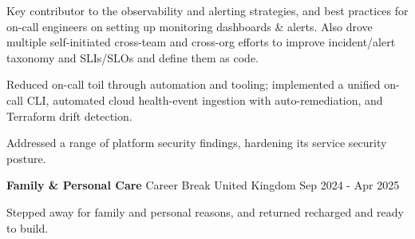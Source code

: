 \begin{cventries}
{\begin{cvitems}
{			            Key contributor to the observability and alerting strategies, and best
			            practices for on-call engineers on setting up monitoring dashboards \&
			            alerts. Also drove multiple self-initiated cross-team and cross-org
			            efforts to improve incident/alert taxonomy and SLIs/SLOs and define
			            them as code.
			      }
			\item {
			            Reduced on-call toil through automation and tooling; implemented a
			            unified on-call CLI, automated cloud health-event ingestion with
			            auto-remediation, and Terraform drift detection.
			      }
			\item {
			            Addressed a range of platform security findings, hardening its service
			            security posture.
			      }
		\end{cvitems}
	}

	\cventry
	{\textbf{Family \& Personal Care}} %
	{Career Break} %
	{United Kingdom} %
	{Sep 2024 - Apr 2025} %
	{
		\begin{cvitems} %
			\item {
			            Stepped away for family and personal reasons, and returned recharged
			            and ready to build.
			      }
		\end{cvitems}
	}


\end{cventries}

